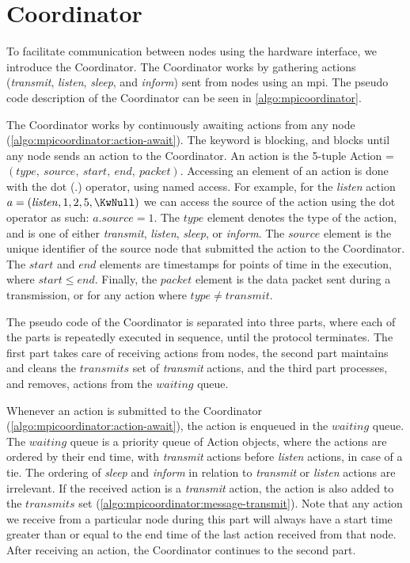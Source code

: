 \clearpage
\section{Coordinator}\label{sec:coordinator}
To facilitate communication between nodes using the hardware interface, we introduce the Coordinator. The Coordinator works by gathering actions (\textit{transmit}, \textit{listen}, \textit{sleep}, and \textit{inform}) sent from nodes using an \gls{mpi}. The pseudo code description of the Coordinator can be seen in \autoref{algo:mpicoordinator}. \smallbreak

The Coordinator works by continuously awaiting actions from any node (\autoref{algo:mpicoordinator:action-await}). The \KwAwait keyword is blocking, and blocks until any node sends an action to the Coordinator. An action is the 5-tuple Action = $(\mathit{type},\ \mathit{source},\ \mathit{start},\ \mathit{end},\ \mathit{packet})$. Accessing an element of an action is done with the dot ($.$) operator, using named access. For example, for the \textit{listen} action $a = (\mathit{listen}, 1, 2, 5, \KwNull)$ we can access the source of the action using the dot operator as such: $a.source = 1$. The $\mathit{type}$ element denotes the type of the action, and is one of either \textit{transmit}, \textit{listen}, \textit{sleep}, or \textit{inform}. The $\mathit{source}$ element is the unique identifier of the source node that submitted the action to the Coordinator. The $\mathit{start}$ and $\mathit{end}$ elements are timestamps for points of time in the execution, where $\mathit{start} \leq \mathit{end}$. Finally, the $\mathit{packet}$ element is the data packet sent during a transmission, or \KwNull for any action where $\mathit{type} \neq \mathit{transmit}$. \smallbreak

The pseudo code of the Coordinator is separated into three parts, where each of the parts is repeatedly executed in sequence, until the protocol terminates. The first part takes care of receiving actions from nodes, the second part maintains and cleans the $\mathit{transmits}$ set of \textit{transmit} actions, and the third part processes, and removes, actions from the $\mathit{waiting}$ queue. \smallbreak

Whenever an action is submitted to the Coordinator (\autoref{algo:mpicoordinator:action-await}), the action is enqueued in the $\mathit{waiting}$ queue. The $\mathit{waiting}$ queue is a priority queue of Action objects, where the actions are ordered by their end time, with \textit{transmit} actions before \textit{listen} actions, in case of a tie. The ordering of \textit{sleep} and \textit{inform} in relation to \textit{transmit} or \textit{listen} actions are irrelevant. If the received action is a \textit{transmit} action, the action is also added to the $\mathit{transmits}$ set (\autoref{algo:mpicoordinator:message-transmit}). Note that any action we receive from a particular node during this part will always have a start time greater than or equal to the end time of the last action received from that node. After receiving an action, the Coordinator continues to the second part. \smallbreak

